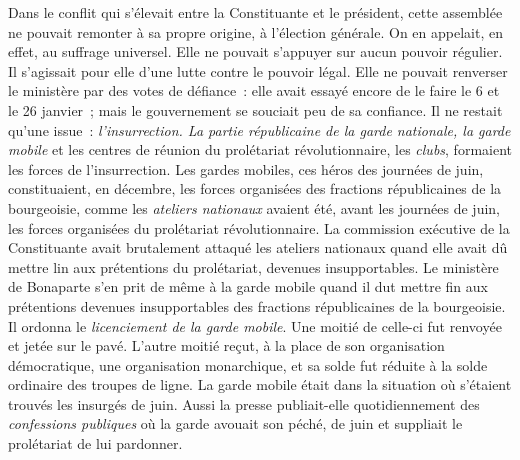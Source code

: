 \documentclass[french,twoside]{book} %
\begin{document}
Dans le conflit qui s’élevait entre la Constituante et le président, cette assemblée ne pouvait remonter à sa propre origine, à l’élection générale. On en appelait, en effet, au suffrage universel. Elle ne pouvait s’appuyer sur aucun pouvoir régulier. Il s’agissait pour elle d’une lutte contre le pouvoir légal. Elle ne pouvait renverser le ministère par des votes de défiance : elle avait essayé encore de le faire le 6 et le 26 janvier ; mais le gouvernement se souciait peu de sa confiance. Il ne restait qu’une issue : \emph{l’insurrection. La partie républicaine de la garde nationale, la garde mobile} et les centres de réunion du prolétariat révolutionnaire, les \emph{clubs}, formaient les forces de l’insurrection. Les gardes mobiles, ces héros des journées de juin, constituaient, en décembre, les forces organisées des fractions républicaines de la bourgeoisie, comme les \emph{ateliers nationaux} avaient été, avant les journées de juin, les forces organisées du prolétariat révolutionnaire. La commission exécutive de la Constituante avait brutalement attaqué les ateliers nationaux quand elle avait dû mettre lin aux prétentions du prolétariat, devenues insupportables. Le ministère de Bonaparte s’en prit de même à la garde mobile quand il dut mettre fin aux prétentions devenues insupportables des fractions républicaines de la bourgeoisie. Il ordonna le \emph{licenciement de la garde mobile}. Une moitié de celle-ci fut renvoyée et jetée sur le pavé. L’autre moitié reçut, à la place de son organisation démocratique, une organisation monarchique, et sa solde fut réduite à la solde ordinaire des troupes de ligne. La garde mobile était dans la situation où s’étaient trouvés les insurgés de juin. Aussi la presse publiait-elle quotidiennement des \emph{confessions publiques} où la garde avouait son péché, de juin et suppliait le prolétariat de lui pardonner.\par
\end{document}

